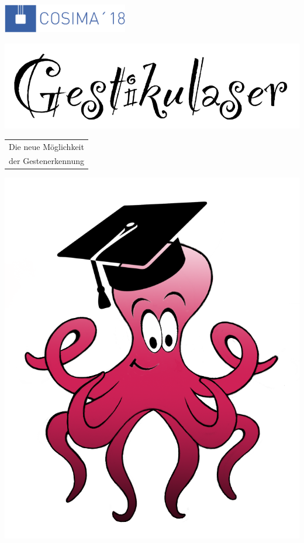 \documentclass[a4paper,12pt,notumble]{leaflet}
\begin{document}
\begin{center}

\includegraphics[height=1.25cm]{../Logos/Cosima18.png}

\vfill

\includegraphics[scale=0.25]{../Logos/GestikulaserSchriftzugOhneHut.png}

\vfill

\normalsize

\begin{tabular}{c}
	Die neue Möglichkeit \\
	der Gestenerkennung
\end{tabular}

\vfill
\includegraphics[scale=0.25]{../Logos/GestikulaserLogoBuntOhneSchrift.png}
\vfill


\end{center}
\end{document}
